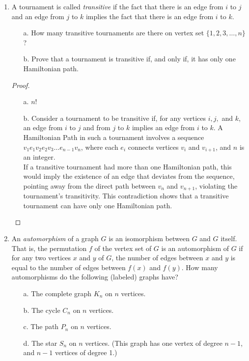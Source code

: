 \documentclass[11pt]{article}
\begin{document}
\begin{enumerate}
    \item A tournament is called \emph{transitive} if the fact that there is an edge from $i$ to $j$ and an edge from $j$ to $k$ implies the fact that there is an edge from $i$ to $k$.
        \begin{itemize}
            \item[a.] How many transitive tournaments are there on vertex set $\{1, 2, 3, \dots, n\}$?
            \item[b.] Prove that a tournament is transitive if, and only if, it has only one Hamiltonian path.
        \end{itemize}

        \begin{proof}
            \begin{enumerate}
                \item[a.] $n!$
                \item[b.] Consider a tournament to be transitive if, for any vertices \(i, j,\) and \(k\), an edge from \(i\) to \(j\) and from \(j\) to \(k\) implies an edge from \(i\) to \(k\). A Hamiltonian Path in such a tournament involves a sequence \(v_1e_1v_2e_2v_3 \dots e_{n-1}v_n\), where each \(e_i\) connects vertices \(v_i\) and \(v_{i+1}\), and \(n\) is an integer. \\ If a transitive tournament had more than one Hamiltonian path, this would imply the existence of an edge that deviates from the sequence, pointing away from the direct path between \(v_n\) and \(v_{n+1}\), violating the tournament's transitivity. This contradiction shows that a transitive tournament can have only one Hamiltonian path.
            \end{enumerate}
        \end{proof}

    \item An \emph{automorphism} of a graph $G$ is an isomorphism between $G$ and $G$ itself. That is, the permutation $f$ of the vertex set of $G$ is an automorphism of $G$ if for any two vertices $x$ and $y$ of $G$, the number of edges between $x$ and $y$ is equal to the number of edges between $f(x)$ and $f(y)$. How many automorphisms do the following (labeled) graphs have?
        \begin{itemize}
            \item[a.] The complete graph $K_n$ on $n$ vertices.
            \item[b.] The cycle $C_n$ on $n$ vertices.
            \item[c.] The path $P_n$ on $n$ vertices.
            \item[d.] The star $S_n$ on $n$ vertices. (This graph has one vertex of degree $n-1$, and $n-1$ vertices of degree 1.)
        \end{itemize}


\end{enumerate}
\end{document}
